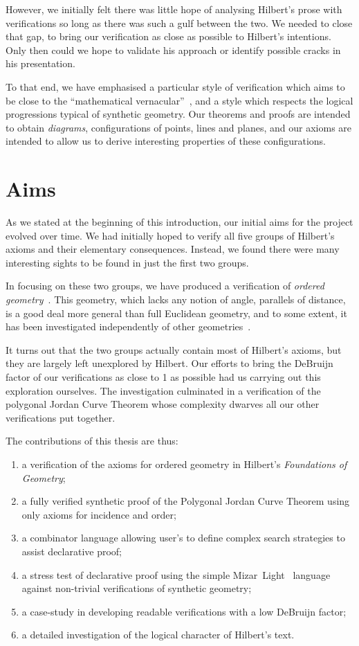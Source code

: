 However, we initially felt there was little hope of analysing Hilbert's prose with verifications so long as there was such a gulf between the two. We needed to close that gap, to bring our verification as close as possible to Hilbert's intentions. Only then could we hope to validate his approach or identify possible cracks in his presentation.

To that end, we have emphasised a particular style of verification which aims to be close to the ``mathematical vernacular''~\cite{MizarMathematicalVernacular}, and a style which respects the logical progressions typical of synthetic geometry. Our theorems and proofs are intended to obtain \emph{diagrams}, configurations of points, lines and planes, and our axioms are intended to allow us to derive interesting properties of these configurations.

\section{Aims}
As we stated at the beginning of this introduction, our initial aims for the project evolved over time. We had initially hoped to verify all five groups of Hilbert's axioms and their elementary consequences. Instead, we found there were many interesting sights to be found in just the first two groups. 

In focusing on these two groups, we have produced a verification of \emph{ordered geometry}~\cite{AxiomaticsOrderedGeometry}. This geometry, which lacks any notion of angle, parallels of distance, is a good deal more general than full Euclidean geometry, and to some extent, it has been investigated independently of other geometries~\cite{AxiomaticsOrderedGeometry}.

It turns out that the two groups actually contain most of Hilbert's axioms, but they are largely left unexplored by Hilbert. Our efforts to bring the DeBruijn factor of our verifications as close to 1 as possible had us carrying out this exploration ourselves. The investigation culminated in a verification of the polygonal Jordan Curve Theorem whose complexity dwarves all our other verifications put together.

The contributions of this thesis are thus:
\begin{enumerate}
\item a verification of the axioms for ordered geometry in Hilbert's \emph{Foundations of Geometry};
\item a fully verified synthetic proof of the Polygonal Jordan Curve Theorem using only axioms for incidence and order;
\item a combinator language allowing user's to define complex search strategies to assist declarative proof;
\item a stress test of declarative proof using the simple Mizar~Light~\cite{MizarLight} language against non-trivial verifications of synthetic geometry;
\item a case-study in developing readable verifications with a low DeBruijn factor;
\item a detailed investigation of the logical character of Hilbert's text.
\end{enumerate}

